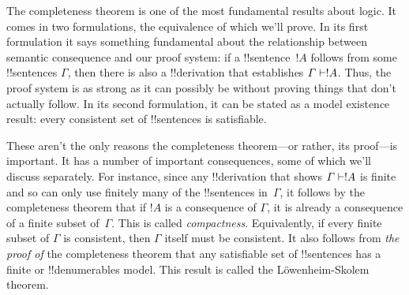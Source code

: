 \documentclass[../../include/open-logic-section]{subfiles}
\begin{document}

The completeness theorem is one of the most fundamental results about
logic.  It comes in two formulations, the equivalence of which we'll
prove. In its first formulation it says something fundamental about
the relationship between semantic consequence and our proof system: if
a !!{sentence}~$!A$ follows from some !!{sentence}s $\Gamma$, then
there is also a !!{derivation} that establishes $\Gamma \Proves !A$.
Thus, the proof system is as strong as it can possibly be without
proving things that don't actually follow.  In its second formulation,
it can be stated as a model existence result: every consistent set of
!!{sentence}s is satisfiable.

These aren't the only reasons the completeness theorem---or rather,
its proof---is important. It has a number of important consequences,
some of which we'll discuss separately.  For instance, since any
!!{derivation} that shows $\Gamma \Proves !A$ is finite and so can
only use finitely many of the !!{sentence}s in~$\Gamma$, it follows by
the completeness theorem that if $!A$ is a consequence of $\Gamma$, it
is already a consequence of a finite subset of~$\Gamma$.  This is
called \emph{compactness}.  Equivalently, if every finite subset of
$\Gamma$ is consistent, then $\Gamma$ itself must be consistent.  It
also follows from \emph{the proof of} the completeness theorem that
any satisfiable set of !!{sentence}s has a finite or !!{denumerable}s
model. This result is called the L\"owenheim-Skolem theorem.
\end{document}
